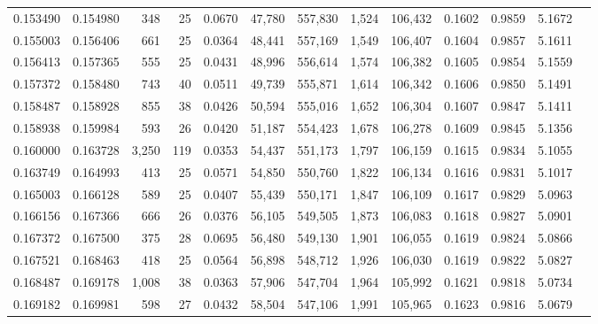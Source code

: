 \begin{tabular}{rrrrrrrrrrrrr}
0.153490 & 0.154980 &   348 &  25 &                                     0.0670 &  47,780 & 557,830 &   1,524 & 106,432 & 0.1602 & 0.9859 & 5.1672 \\
0.155003 & 0.156406 &   661 &  25 &                                     0.0364 &  48,441 & 557,169 &   1,549 & 106,407 & 0.1604 & 0.9857 & 5.1611 \\
0.156413 & 0.157365 &   555 &  25 &                                     0.0431 &  48,996 & 556,614 &   1,574 & 106,382 & 0.1605 & 0.9854 & 5.1559 \\
0.157372 & 0.158480 &   743 &  40 &                                     0.0511 &  49,739 & 555,871 &   1,614 & 106,342 & 0.1606 & 0.9850 & 5.1491 \\
0.158487 & 0.158928 &   855 &  38 &                                     0.0426 &  50,594 & 555,016 &   1,652 & 106,304 & 0.1607 & 0.9847 & 5.1411 \\
0.158938 & 0.159984 &   593 &  26 &                                     0.0420 &  51,187 & 554,423 &   1,678 & 106,278 & 0.1609 & 0.9845 & 5.1356 \\
0.160000 & 0.163728 & 3,250 & 119 &                                     0.0353 &  54,437 & 551,173 &   1,797 & 106,159 & 0.1615 & 0.9834 & 5.1055 \\
0.163749 & 0.164993 &   413 &  25 &                                     0.0571 &  54,850 & 550,760 &   1,822 & 106,134 & 0.1616 & 0.9831 & 5.1017 \\
0.165003 & 0.166128 &   589 &  25 &                                     0.0407 &  55,439 & 550,171 &   1,847 & 106,109 & 0.1617 & 0.9829 & 5.0963 \\
0.166156 & 0.167366 &   666 &  26 &                                     0.0376 &  56,105 & 549,505 &   1,873 & 106,083 & 0.1618 & 0.9827 & 5.0901 \\
0.167372 & 0.167500 &   375 &  28 &                                     0.0695 &  56,480 & 549,130 &   1,901 & 106,055 & 0.1619 & 0.9824 & 5.0866 \\
0.167521 & 0.168463 &   418 &  25 &                                     0.0564 &  56,898 & 548,712 &   1,926 & 106,030 & 0.1619 & 0.9822 & 5.0827 \\
0.168487 & 0.169178 & 1,008 &  38 &                                     0.0363 &  57,906 & 547,704 &   1,964 & 105,992 & 0.1621 & 0.9818 & 5.0734 \\
0.169182 & 0.169981 &   598 &  27 &                                     0.0432 &  58,504 & 547,106 &   1,991 & 105,965 & 0.1623 & 0.9816 & 5.0679 \\

\end{tabular}
